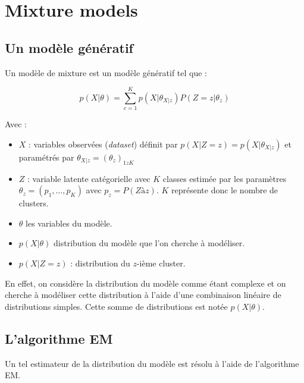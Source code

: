 \chapter{Mixture models}

\section{Un modèle génératif}

\noindent Un modèle de mixture est un modèle génératif tel que :

\begin{equation}
    p(X | \theta) = \sum_{c=1}^K p(X | \theta_{X | z})P(Z = z | \theta_z)
\end{equation}

Avec : \newline

\begin{itemize}
    \item $X$ : variables observées (\textit{dataset}) définit par $p(X | Z = z) = p(X | \theta_{X | z})$ et paramétrés par $\theta_{X | z} = (\theta_z)_{1 z K}$ \\
    \item $Z$ : variable latente catégorielle avec $K$ classes estimée par les paramètres $\theta_z = (p_1, \dots, p_K)$ avec $p_z = P(Z à z)$. $K$ représente donc le nombre de clusters. \\
    \item $\theta$ les variables du modèle. \\
    \item $p(X | \theta)$ distribution du modèle que l'on cherche à modéliser. \\
    \item $p(X | Z = z)$ : distribution du $z$-ième cluster. \\
\end{itemize}

\noindent En effet, on considère la distribution du modèle comme étant complexe et on cherche à modéliser cette distribution à l'aide 
d'une combinaison linéaire de distributions simples. Cette somme de distributions est notée $p(X | \theta)$.

\section{L'algorithme EM}

\noindent Un tel estimateur de la distribution du modèle est résolu à l'aide de l'algorithme EM.
